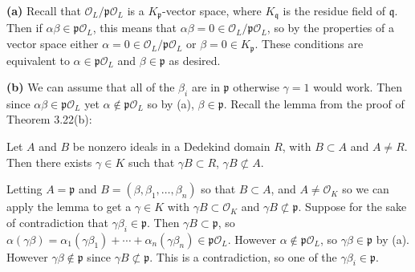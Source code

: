 \documentclass[11pt,letterpaper]{article}
\begin{document}
\begin{solution}
    \textbf{(a)} Recall that $\mathcal{O}_L / \mathfrak{p} \mathcal{O}_L$ is a $K_{\mathfrak{p}}$-vector space, where $K_{\mathfrak{q}}$ is the residue field of $\mathfrak{q}$. Then if $\alpha\beta\in \mathfrak{p} \mathcal{O}_L$, this means that $\alpha\beta = 0 \in \mathcal{O}_L / \mathfrak{p} \mathcal{O}_L$, so by the properties of a vector space either $\alpha = 0\in \mathcal{O}_L / \mathfrak{p} \mathcal{O}_L$ or $\beta = 0\in K_{\mathfrak{p}}$. These conditions are equivalent to $\alpha\in \mathfrak{p} \mathcal{O}_L$ and $\beta\in \mathfrak{p}$ as desired.  
    
    \textbf{(b)} We can assume that all of the $\beta_i$ are in $\mathfrak{p}$ otherwise $\gamma=1$ would work. Then since $\alpha\beta\in \mathfrak{p}\mathcal{O}_L$ yet $\alpha\not\in \mathfrak{p}\mathcal{O}_L$ so by (a), $\beta\in \mathfrak{p}$. Recall the lemma from the proof of Theorem 3.22(b):
    \begin{ilemma}
        Let $A$ and $B$ be nonzero ideals in a Dedekind domain $R$, with $B \subset A$ and $A \neq R$. Then there exists $\gamma\in K$ such that $\gamma B\subset R$, $\gamma B \not\subset A$.
    \end{ilemma}
    Letting $A=\mathfrak{p}$ and $B=(\beta, \beta_1,\ldots,\beta_n)$ so that $B\subset A$, and $A\neq \mathcal{O}_K$ so we can apply the lemma to get a $\gamma\in K$ with $\gamma B \subset \mathcal{O}_K$ and $\gamma B\not\subset \mathfrak{p}$. Suppose for the sake of contradiction that $\gamma \beta_i\in \mathfrak{p}$. Then $\gamma B\subset \mathfrak{p}$, so $\alpha(\gamma \beta)=\alpha_1(\gamma \beta_1)+\cdots+\alpha_n (\gamma \beta_n)\in \mathfrak{p} \mathcal{O}_L$. However $\alpha\not\in \mathfrak{p} \mathcal{O}_L$, so $\gamma \beta\in \mathfrak{p}$ by (a). However $\gamma\beta\not\in \mathfrak{p}$ since $\gamma B\not\subset \mathfrak{p}$. This is a contradiction, so one of the $\gamma\beta_i\in \mathfrak{p}$.
    

\end{solution}
\end{document}
